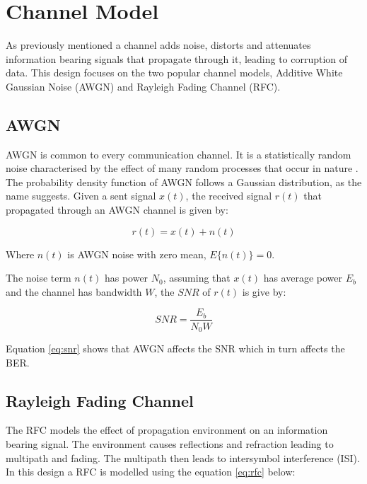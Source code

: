 \documentclass[11pt]{report}
\begin{document}
\section{Channel Model}
\label{sec:channel}
As previously mentioned a channel adds noise, distorts and attenuates information bearing signals that propagate through it, leading to corruption of data. This design focuses on the two popular channel models, Additive White Gaussian Noise (AWGN) and Rayleigh Fading Channel (RFC). 

\subsection{AWGN}
\label{sub:awgn}
AWGN is common to every communication channel. It is a statistically random noise characterised by the effect of many random processes that occur in nature \cite{72}. The probability density function of AWGN follows a Gaussian distribution, as the name suggests. Given a sent signal $x(t)$, the received signal $r(t)$ that propagated through an AWGN channel is given by:

\begin{equation}
\label{eq:rawgn}
r(t) = x(t) + n(t)
\end{equation}

\begin{center}
Where $n(t)$ is AWGN noise with zero mean, $E\{n(t)\} = 0$.
\end{center}

The noise term $n(t)$ has power $N_0$, assuming that $x(t)$ has average power $E_b$ and the channel has bandwidth $W$, the $SNR$ of $r(t)$ is give by:

\begin{equation}
\label{eq:snr}
SNR = \frac{E_b}{N_0W}
\end{equation} 

Equation \ref{eq:snr} shows that AWGN affects the SNR which in turn affects the BER.

\subsection{Rayleigh Fading Channel}
\label{sub:rfc}
The RFC models the effect of propagation environment on an information bearing signal. The environment causes reflections and refraction leading to multipath and fading. The multipath then leads to intersymbol interference (ISI). In this design a RFC is modelled using the equation \ref{eq:rfc} below:
\end{document}
